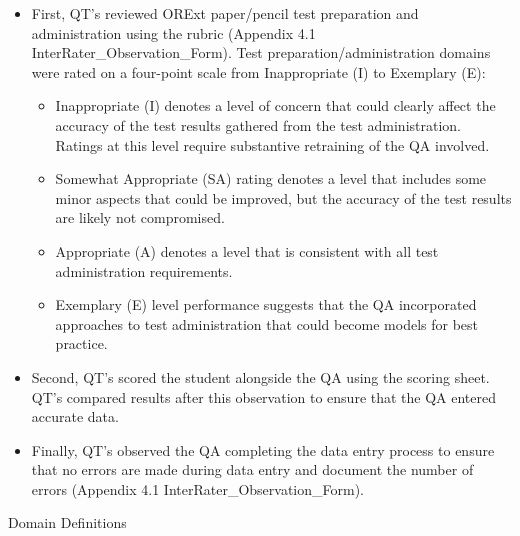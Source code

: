 \documentclass[]{article}
\begin{document}
\begin{itemize}
\item
  First, QT's reviewed ORExt paper/pencil test preparation and
  administration using the rubric (Appendix 4.1
  InterRater\_Observation\_Form). Test preparation/administration
  domains were rated on a four-point scale from Inappropriate (I) to
  Exemplary (E):

  \begin{itemize}
  \item
    Inappropriate (I) denotes a level of concern that could clearly
    affect the accuracy of the test results gathered from the test
    administration. Ratings at this level require substantive retraining
    of the QA involved.
  \item
    Somewhat Appropriate (SA) rating denotes a level that includes some
    minor aspects that could be improved, but the accuracy of the test
    results are likely not compromised.
  \item
    Appropriate (A) denotes a level that is consistent with all test
    administration requirements.
  \item
    Exemplary (E) level performance suggests that the QA incorporated
    approaches to test administration that could become models for best
    practice.
  \end{itemize}
\item
  Second, QT's scored the student alongside the QA using the scoring
  sheet. QT's compared results after this observation to ensure that the
  QA entered accurate data.
\item
  Finally, QT's observed the QA completing the data entry process to
  ensure that no errors are made during data entry and document the
  number of errors (Appendix 4.1 InterRater\_Observation\_Form).
\end{itemize}

Domain Definitions
\end{document}
